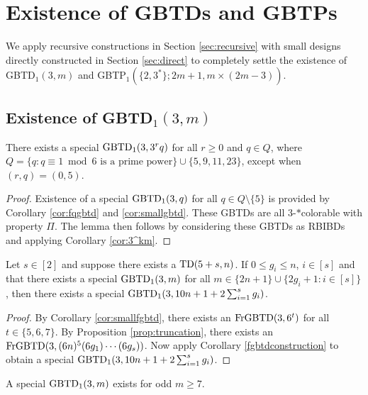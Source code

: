 \documentclass[draft, 11pt]{article}
\begin{document}
 \section{Existence of GBTDs and GBTPs}

We apply recursive constructions in Section
 \ref{sec:recursive} with small designs directly constructed in
 Section \ref{sec:direct} to completely settle the existence of
 GBTD$_1(3,m)$ and GBTP$_1(\{2,3^*\};2m+1,m\times(2m-3))$.
 

 \subsection{Existence of GBTD$_1(3,m)$}

 \begin{lemma}
 \label{lem:3^rq} There exists a special ${\rm GBTD}_1(3,3^rq)$ for
 all $r\geq 0$ and $q\in Q$, where $Q=\{q:\text{$q\equiv 1\bmod 6$ is a
 prime power}\}\cup\{5,9,11,23\}$, except when $(r,q)=(0,5)$.
 \end{lemma}

\begin{proof}
Existence of a special ${\rm GBTD}_1(3,q)$ for all $q\in Q\setminus \{5\}$ is provided by
Corollary \ref{cor:fqgbtd} and \ref{cor:smallgbtd}. These
GBTDs are all $3$-$*$colorable with property $\Pi$. The lemma then follows by considering these
GBTDs as RBIBDs and applying Corollary \ref{cor:3^km}.
\end{proof}
 
\begin{lemma}
\label{lem:10n+1}Let $s\in [2]$ and suppose there exists a ${\rm
TD}(5+s,n)$. If $0\leq g_i\leq n$, $i\in[s]$ and that there exists a
special ${\rm GBTD}_1(3,m)$ for all
$m\in\{2n+1\}\cup\{2g_i+1:i\in[s]\}$, then there exists a special
${\rm GBTD}_1(3,10n+1+2\sum_{i=1}^s g_i)$.
\end{lemma}

\begin{proof}
By Corollary \ref{cor:smallfgbtd}, there exists an ${\rm
FrGBTD}(3,6^t)$ for all $t\in\{5,6,7\}$. By Proposition
\ref{prop:truncation}, there exists an ${\rm
FrGBTD}(3,(6n)^5(6g_1)\cdots (6g_s))$. Now apply Corollary
\ref{fgbtdconstruction} to obtain a special ${\rm
GBTD}_1(3,10n+1+2\sum_{i=1}^s g_i)$.
\end{proof}
 


\begin{lemma}
\label{lem:generalcase} A special ${\rm GBTD}_1(3,m)$ exists for odd $m\ge 7$.
\end{lemma}
\end{document}
